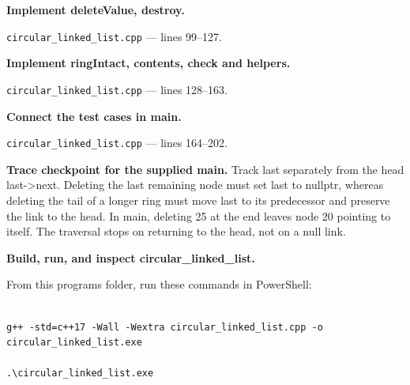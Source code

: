 \begin{utpsteps}\setcounter{enumi}{3}\item \textbf{Implement deleteValue, destroy.}\end{utpsteps}

\texttt{circular\_linked\_list.cpp} --- lines 99--127.




\tcbbreak

\begin{utpsteps}\setcounter{enumi}{4}\item \textbf{Implement ringIntact, contents, check and helpers.}\end{utpsteps}

\texttt{circular\_linked\_list.cpp} --- lines 128--163.




\tcbbreak

\begin{utpsteps}\setcounter{enumi}{5}\item \textbf{Connect the test cases in main.}\end{utpsteps}

\texttt{circular\_linked\_list.cpp} --- lines 164--202.

\textbf{Trace checkpoint for the supplied main.} Track last separately from the head last->next. Deleting the last remaining node must set last to nullptr, whereas deleting the tail of a longer ring must move last to its predecessor and preserve the link to the head. In main, deleting 25 at the end leaves node 20 pointing to itself. The traversal stops on returning to the head, not on a null link.




\tcbbreak

\textbf{Build, run, and inspect circular\_linked\_list.}

From this program\textquotesingle s folder, run these commands in PowerShell:

\begin{lstlisting}[style=utpterminal,language={}]

g++ -std=c++17 -Wall -Wextra circular_linked_list.cpp -o circular_linked_list.exe

.\circular_linked_list.exe

\end{lstlisting}


